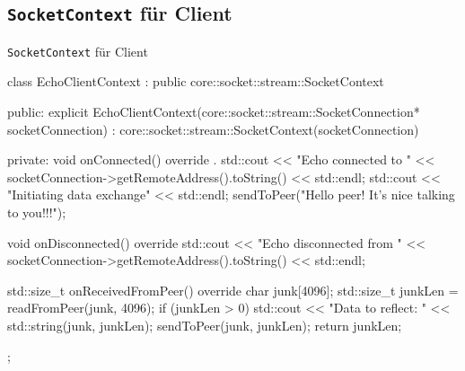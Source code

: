 \subsection{\texttt{SocketContext} für Client}

\begin{frame}[fragile]{\texttt{SocketContext} für Client}
  \begin{cppcode}[autogobble=true]
    class EchoClientContext : public core::socket::stream::SocketContext {
      public:
      explicit EchoClientContext(core::socket::stream::SocketConnection* socketConnection)
      : core::socket::stream::SocketContext(socketConnection) {
      }

      private:
      void onConnected() override {.
        std::cout << "Echo connected to " << socketConnection->getRemoteAddress().toString() << std::endl;
        std::cout << "Initiating data exchange" << std::endl;
        sendToPeer("Hello peer! It's nice talking to you!!!\n");
      }

      void onDisconnected() override {
        std::cout << "Echo disconnected from " << socketConnection->getRemoteAddress().toString() << std::endl;
      }

      std::size_t onReceivedFromPeer() override {
        char junk[4096];
        std::size_t junkLen = readFromPeer(junk, 4096);
        if (junkLen > 0) {
          std::cout << "Data to reflect: " << std::string(junk, junkLen);
          sendToPeer(junk, junkLen);
        }
        return junkLen;
      }
    };
  \end{cppcode}
\end{frame}
